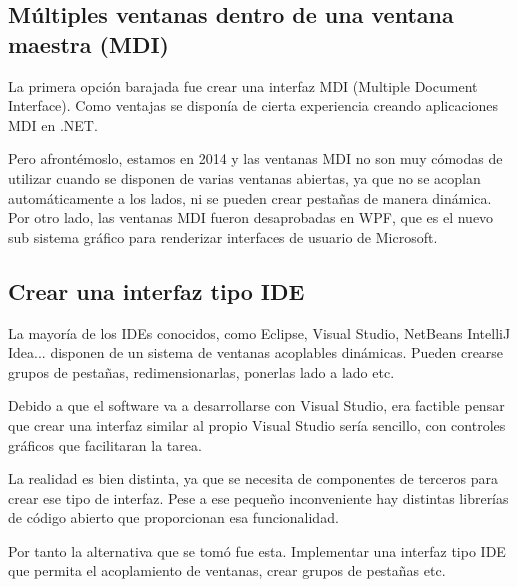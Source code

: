 \subsection{M\'ultiples ventanas dentro de una ventana maestra (MDI)}
La primera opci\'on barajada fue crear una interfaz MDI (Multiple Document Interface). Como ventajas se
dispon\'ia de cierta experiencia creando aplicaciones MDI en .NET.

Pero afront\'emoslo, estamos en 2014 y las ventanas MDI no son muy c\'omodas de utilizar cuando se disponen de varias ventanas
abiertas, ya que no se acoplan autom\'aticamente a los lados, ni se pueden crear pesta\~nas de manera din\'amica.
Por otro lado, las ventanas MDI fueron desaprobadas en WPF, que es el nuevo sub sistema gr\'afico para renderizar 
interfaces de usuario de Microsoft.

\subsection{Crear una interfaz tipo IDE}
La mayor\'ia de los IDEs conocidos, como Eclipse, Visual Studio, NetBeans IntelliJ Idea... disponen de un sistema de 
ventanas acoplables din\'amicas. Pueden crearse grupos de pesta\~nas, redimensionarlas, ponerlas lado a lado etc.

Debido a que el software va a desarrollarse con Visual Studio, era factible pensar que crear una interfaz similar al propio
Visual Studio ser\'ia sencillo, con controles gr\'aficos que facilitaran la tarea.

La realidad es bien distinta, ya que se necesita de componentes de terceros para crear ese tipo de interfaz. Pese a ese
peque\~no inconveniente hay distintas librer\'ias de c\'odigo abierto que proporcionan esa funcionalidad.

Por tanto la alternativa que se tom\'o fue esta. Implementar una interfaz tipo IDE que permita el acoplamiento de ventanas,
crear grupos de pesta\~nas etc.
